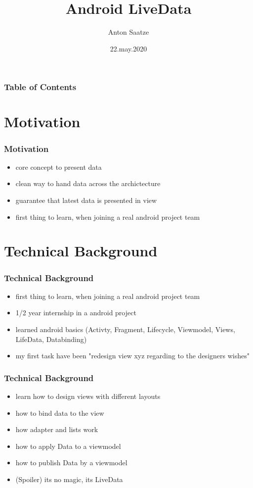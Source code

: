 \documentclass{beamer}
\author{Anton Saatze}
\title{Android LiveData}
\institute{University of applied Sciences Munich}
\date{22.may.2020}
\begin{document}
	\maketitle
	
	\begin{frame}
		\frametitle{Table of Contents}
		\tableofcontents
	\end{frame}
	
	\section[Motivation]{Motivation}
	\begin{frame}
		\frametitle{Motivation}
		\begin{itemize}
		\item core concept to present data
		\item clean way to hand data across the archictecture
		\item guarantee that latest data is presented in view
		\item first thing to learn, when joining a real android project team
		\end{itemize}
	\end{frame}
	
	\section[Technical Background]{Technical Background}
	\begin{frame}
		\frametitle{Technical Background}
		\begin{itemize}
		\item first thing to learn, when joining a real android project team
		\item 1/2 year internship in a android project
		\item learned android basics (Activty, Fragment, Lifecycle, Viewmodel, Views, LifeData, Databinding)
		\item my first task have been "redesign view xyz regarding to the designers wishes"
		\end{itemize}
		\end{frame}
		\begin{frame}
		\frametitle{Technical Background}
		\begin{itemize}
		\item learn how to design views with different layouts
		\item how to bind data to the view
		\item how adapter and lists work
		\item how to apply Data to a viewmodel
		\item how to publish Data by a viewmodel
		\item (Spoiler) its no magic, its LiveData
		\end{itemize}
	\end{frame}
	
\end{document}
